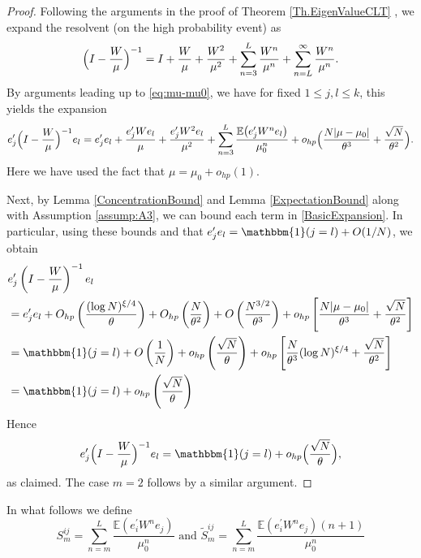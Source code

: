 \documentclass[11pt, reqno]{amsart}
\DeclareMathOperator{\one}{\mathbbm{1}} %
\numberwithin{equation}{section}
\begin{document}
\begin{proof} Following the arguments in the proof of Theorem \ref{Th.EigenValueCLT} , we expand the resolvent (on the high probability event) as
$$\Bigl(I - \frac{W}{\mu}\Bigr)^{-1} = I + \frac{W}{\mu} + \frac{W^2}{\mu^2} + \sum_{n=3}^L \frac{W^n}{\mu^n} + \sum_{n=L}^\infty \frac{W^n}{\mu^n}.$$
By arguments leading up to \eqref{eq:mu-mu0}, we have for fixed $1 \le j,l \le k$, this yields the expansion
\begin{equation}\label{BasicExpansion}
e_j^\prime\Bigl(I-\frac{W}{\mu}\Bigr)^{-1}e_l = e_j^\prime e_l + \frac{e_j^\prime W e_l}{\mu} + \frac{e_j^\prime W^2 e_l}{\mu^2} + \sum_{n=3}^L \frac{\mathbb E\bigl(e_j^\prime W^n e_l\bigr)}{\mu_0^n} + o_{hp}\Bigl(\frac{N|\mu - \mu_0|}{\theta^3} + \frac{\sqrt{N}}{\theta^2}\Bigr).
\end{equation}
Here we have used the fact that $\mu = \mu_0 + o_{hp}(1)$. 

Next, by Lemma \ref{ConcentrationBound} and Lemma \ref{ExpectationBound} along with Assumption \ref{assump:A3}, we can bound each term in \eqref{BasicExpansion}.  In particular, using these bounds and that $e_j^\prime e_l = \one(j=l) + O(1/N)$, we obtain
\begin{align}
&\label{BasicApprox1}e_j^\prime\left(I-\frac{W}{\mu}\right)^{-1}e_l \\ & = e_j
^\prime e_l + O_{hp}\left(\frac{(\log N)^{\xi/4}}{\theta}\right) + O
_{hp}\left(\frac{N}{\theta^2}\right) + O\left(\frac{N^{3/2}}{\theta^3}\right) + o_{hp}\left[ \frac{N|\mu - \mu_0|}{\theta^3} + \frac{\sqrt{N}}{\theta^2}\right]\\
\nonumber & = \one(j =l) + O\left(\frac{1}{N}\right) + o_{hp}\left(\frac{\sqrt{N}}{\theta}\right) + o_{hp}\left[ \frac{N}{\theta^3}(\log N)^{\xi/4} + \frac{\sqrt{N}}{\theta^2}\right]\\
&\label{BasicApprox2} = \one(j =l) + o_{hp}\left(\frac{\sqrt{N}}{\theta}\right)
\end{align}
Hence
\[
e_j^\prime\Bigl(I-\frac{W}{\mu}\Bigr)^{-1}e_l = \one(j=l) + o_{hp}\Bigl(\frac{\sqrt{N}}{\theta}\Bigr),
\]
as claimed.  The case $m=2$ follows by a similar argument. 
\end{proof}

In what follows we define 
\begin{equation}\label{def:s_m}
S_m^{ij} = \sum_{n = m}^L \frac{\mathbb E(e_i^\prime W^n e_j)}{\mu_0^n} \text{ and } \tilde S_{m}^{ij} = \sum_{n = m}^L \frac{\mathbb E(e_i^\prime W^n e_j)(n+1)}{\mu_0^n}
\end{equation}
\end{document}
